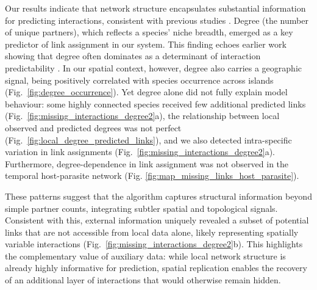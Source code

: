\documentclass[oneside, a4paper, onecolumn, 11pt]{article}
\newcommand{\revtag}[1]{\textcolor{softcoral}{[#1]}}
\begin{document}
Our results indicate that network structure encapsulates substantial information for predicting interactions, consistent with previous studies \citep{Terry2020-wv,Strydom2022-fe,Strydom2023-rc,Biton2025-jj}. Degree (the number of unique partners), which reflects a species’ niche breadth, emerged as a key predictor of link assignment in our system. This finding echoes earlier work showing that degree often dominates as a determinant of interaction predictability \citep{Farrell2022-ki,Biton2025-jj}. In our spatial context, however, degree also carries a geographic signal, being positively correlated with species occurrence across islands (Fig.~\ref{fig:degree_occurrence}). 
Yet degree alone did not fully explain model behaviour: some highly connected species received few additional predicted links (Fig.~\ref{fig:missing_interactions_degree2}a), the relationship between local observed and predicted degrees was not perfect (Fig.~\ref{fig:local_degree_predicted_links}), and we also detected intra-specific variation in link assignments (Fig.~\ref{fig:missing_interactions_degree2}a). %
Furthermore, degree-dependence in link assignment was not observed in the temporal host-parasite network (Fig. \ref{fig:map_missing_links_host_parasite}). %

These patterns suggest that the algorithm captures structural information beyond simple partner counts, integrating subtler spatial and topological signals. Consistent with this, external information uniquely revealed a subset of potential links that are not accessible from local data alone, likely representing spatially variable interactions (Fig.~\ref{fig:missing_interactions_degree2}b). This highlights the complementary value of auxiliary data: while local network structure is already highly informative for prediction, spatial replication enables the recovery of an additional layer of interactions that would otherwise remain hidden. %
\end{document}
